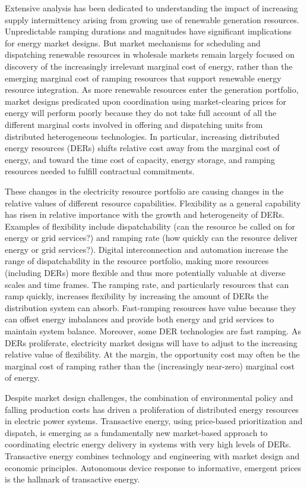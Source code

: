 \documentclass[10pt,twocolumn]{article}
\begin{document}
Extensive analysis has been dedicated to understanding the impact of increasing supply intermittency arising from growing use of renewable generation resources. Unpredictable ramping durations and magnitudes have significant implications for energy market designs. But market mechanisms for scheduling and dispatching renewable resources in wholesale markets remain largely focused on discovery of the increasingly irrelevant marginal cost of energy, rather than the emerging marginal cost of ramping resources that support renewable energy resource integration. As more renewable resources enter the generation portfolio, market designs predicated upon coordination using market-clearing prices for energy will perform poorly because they do not take full account of all the different marginal costs involved in offering and dispatching units from distributed heterogeneous technologies. In particular, increasing distributed energy resources (DERs) shifts relative cost away from the marginal cost of energy, and toward the time cost of capacity, energy storage, and ramping resources needed to fulfill contractual commitments.

These changes in the electricity resource portfolio are causing changes in the relative values of different resource capabilities. Flexibility as a general capability has risen in relative importance with the growth and heterogeneity of DERs. Examples of flexibility include dispatchability (can the resource be called on for energy or grid services?) and ramping rate (how quickly can the resource deliver energy or grid services?). Digital interconnection and automation increase the range of dispatchability in the resource portfolio, making more resources (including DERs) more flexible and thus more potentially valuable at diverse scales and time frames. The ramping rate, and particularly resources that can ramp quickly, increases flexibility by increasing the amount of DERs the distribution system can absorb. Fast-ramping resources have value because they can offset energy imbalances and provide both energy and grid services to maintain system balance. Moreover, some DER technologies are fast ramping. As DERs proliferate, electricity market designs will have to adjust to the increasing relative value of flexibility. At the margin, the opportunity cost may often be the marginal cost of ramping rather than the (increasingly near-zero) marginal cost of energy.

Despite market design challenges, the combination of environmental policy and falling production costs has driven a proliferation of distributed energy resources in electric power systems. Transactive energy, using price-based prioritization and dispatch, is emerging as a fundamentally new market-based approach to coordinating electric energy delivery in systems with very high levels of DERs. Transactive energy combines technology and engineering with market design and economic principles. Autonomous device response to informative, emergent prices is the hallmark of transactive energy.  
\end{document}
